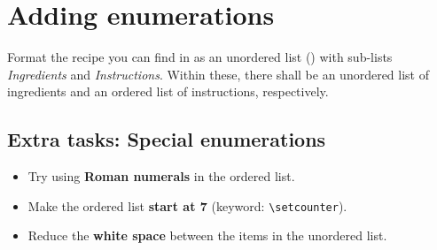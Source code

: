 \section{Adding enumerations}

Format the recipe you can find in  as an 
unordered list () with sub-lists \emph{Ingredients} 
and \emph{Instructions}. 
Within these, there shall be an unordered list of ingredients and an ordered list of 
instructions, respectively.

\subsection*{Extra tasks: Special enumerations}

\begin{itemize}
    \item Try using \textbf{Roman numerals} in the ordered list.
    \item Make the ordered list \textbf{start at 7} (keyword: \texttt{\textbackslash setcounter}).
    \item Reduce the \textbf{white space} between the items in the unordered list.
\end{itemize}